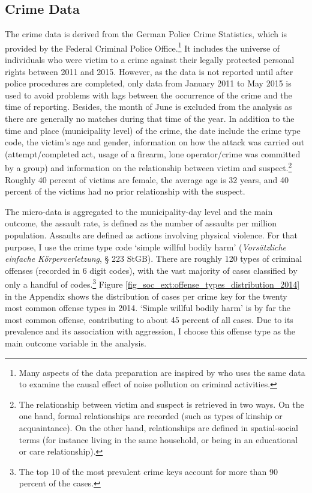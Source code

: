 

\subsection{Crime Data}
The crime data is derived from the German Police Crime Statistics, which is provided by the Federal Criminal Police Office.\footnote{Many aspects of the data preparation are inspired by \cite{hener2019noise} who uses the same data to examine the causal effect of noise pollution on criminal activities.} It includes the universe of individuals who were victim to a crime against their legally protected personal rights between 2011 and 2015. However, as the data is not reported until after police procedures are completed, only data from January 2011 to May 2015 is used to avoid problems with lags between the occurrence of the crime and the time of reporting. Besides, the month of June is excluded from the analysis as there are generally no matches during that time of the year. In addition to the time and place (municipality level) of the crime, the date include the crime type code, the victim's age and gender, information on how the attack was carried out (attempt/completed act, usage of a firearm, lone operator/crime was committed by a group) and information on the relationship between victim and suspect.\footnote{The relationship between victim and suspect is retrieved in two ways. On the one hand, formal relationships are recorded (such as types of kinship or acquaintance). On the other hand, relationships are defined in spatial-social terms (for instance living in the same household, or being in an educational or care relationship).} Roughly 40 percent of victims are female, the average age is 32 years, and 40 percent of the victims had no prior relationship with the suspect.




The micro-data is aggregated to the municipality-day level and the main outcome, the assault rate, is defined as the number of assaults per million population. Assaults are defined as actions involving physical violence. For that purpose, I use the crime type code `simple willful bodily harm' (\textit{Vorsätzliche einfache Körperverletzung}, § 223 StGB). There are roughly 120 types of criminal offenses (recorded in 6 digit codes), with the vast majority of cases classified by only a handful of codes.\footnote{The top 10 of the most prevalent crime keys account for more than 90 percent of the cases.} Figure \ref{fig_soc_ext:offense_types_distribution_2014} in the Appendix shows the distribution of cases per crime key for the twenty most common offense types in 2014. `Simple willful bodily harm' is by far the most common offense, contributing to about 45 percent of all cases. Due to its prevalence and its association with aggression, I choose this offense type as the main outcome variable in the analysis.

